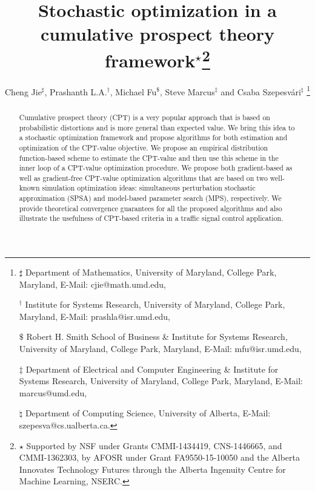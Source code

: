 \documentclass[twocolumn]{IEEEtran}
\begin{document}
\title{Stochastic optimization in a cumulative prospect theory framework$^\star$\thanks{$\star$ Supported by NSF under Grants CMMI-1434419, CNS-1446665, and
CMMI-1362303, by AFOSR under Grant FA9550-15-10050 and the Alberta Innovates Technology Futures through the Alberta Ingenuity Centre for Machine Learning, NSERC.}}
\author{Cheng Jie$^\sharp$, Prashanth L.A.$^\dagger$, Michael Fu$^\$$, Steve Marcus$^\ddag$ and Csaba Szepesv\'ari$^\natural$
\thanks{
$\sharp$ Department of Mathematics,
University of Maryland, College Park, Maryland, 
E-Mail: cjie@math.umd.edu, 

$^\dagger$ Institute for Systems Research, University of Maryland, College Park, Maryland,
E-Mail: prashla@isr.umd.edu,

$\$$ Robert H. Smith School of Business \& Institute for Systems Research,
University of Maryland, College Park, Maryland,
E-Mail: mfu@isr.umd.edu,

$\ddag$ Department of Electrical and Computer Engineering \& Institute for Systems Research,
University of Maryland, College Park, Maryland,
 E-Mail: marcus@umd.edu,

$\natural$ Department of Computing Science,
University of Alberta,
 E-Mail: szepesva@cs.ualberta.ca.
}}
\maketitle


\begin{abstract}
Cumulative prospect theory (CPT) is a very popular approach that is based on probabilistic distortions and is more general than expected value.  We bring this idea to a stochastic optimization framework and propose algorithms for both estimation and optimization of the CPT-value objective. We propose an empirical distribution function-based scheme to estimate the CPT-value and then use this scheme in the inner loop of a CPT-value optimization procedure. We propose both gradient-based as well as gradient-free CPT-value optimization algorithms that are based on two well-known simulation optimization ideas: simultaneous perturbation stochastic approximation (SPSA) and model-based parameter search (MPS), respectively.  We provide theoretical convergence guarantees for all the proposed algorithms 
and also illustrate the usefulness of CPT-based criteria in a traffic signal control application.
\end{abstract}
\end{document}
